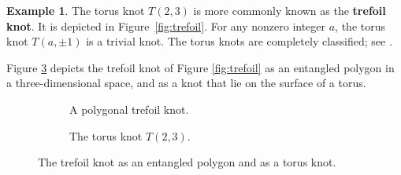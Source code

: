 \documentclass[11pt,a4paper]{article}
\theoremstyle{definition}
\newtheorem{example}[theorem]{Example}
\begin{document}
\begin{example}
\label{ex:trefoil}
The {torus knot} $T(2,3)$ is more commonly known as the \textbf{trefoil knot}.  
It is depicted in Figure~\ref{fig:trefoil}. For any nonzero integer $a$, the torus knot
$T(a,\pm 1)$ is a trivial knot. The torus knots are completely classified; see \cite[Theorem 7.4.3]{murasugi1996knot}.


Figure \ref{fig:torus-poly}  depicts
the trefoil knot of Figure \ref{fig:trefoil} as an entangled polygon in a three-dimensional space, and as a knot that lie on the surface of a torus.

\begin{figure}[h!]
    \centering
\begin{subfigure}{.3\textwidth}
\centering
{}
    \caption{A polygonal trefoil knot.}
    \label{fig:poly_trefoil}
\end{subfigure}
\hspace{0.1\textwidth}
\begin{subfigure}{.5\textwidth}
\centering
     \caption{The torus knot $T(2,3)$.}
    \label{fig:tor_trefoil}

\end{subfigure}

\caption{The trefoil knot as an entangled polygon and as a torus knot.}
\label{fig:torus-poly}
\end{figure}
\end{example}
\end{document}
